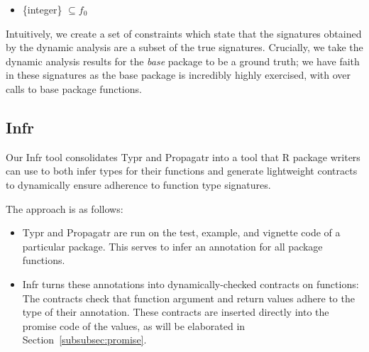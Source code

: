 \documentclass[sigplan,10pt,review,anonymous]{acmart}\settopmatter{printfolios=true,printccs=false,printacmref=false}
\begin{document}
\begin{itemize}
\item \{integer\} $\subseteq f_{0}$
\end{itemize}

Intuitively, we create a set of constraints which state that the signatures obtained by the dynamic analysis are a subset of the true signatures.
Crucially, we take the dynamic analysis results for the {\it base} package to be a ground truth; we have faith in these signatures as the base package is incredibly highly exercised, with over  calls to base package functions.

%
%
%
%
\subsection{Infr}


Our Infr tool consolidates Typr and Propagatr into a tool that R package writers can use to both infer types for their functions and generate lightweight contracts to dynamically ensure adherence to function type signatures.

The approach is as follows:

\begin{itemize}
\item Typr and Propagatr are run on the test, example, and vignette code of a particular package.
This serves to infer an annotation for all package functions.
\item Infr turns these annotations into dynamically-checked contracts on functions:
The contracts check that function argument and return values adhere to the type of their annotation.
These contracts are inserted directly into the promise code of the values, as will be elaborated in Section~\ref{subsubsec:promise}.
\end{itemize}
\end{document}
